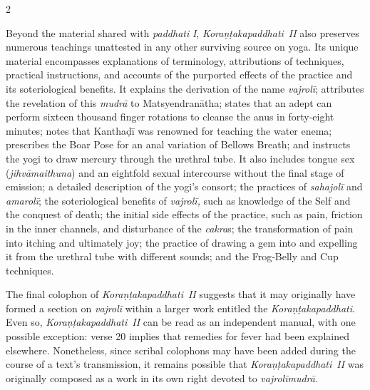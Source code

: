 \begin{nohyp}
\begin{multicols*}{2}
\begin{eng}
Beyond the material shared with \emph{paddhati} \emph{I}, \emph{Koraṇṭakapaddhati}~\emph{II} also preserves numerous teachings unattested in any other surviving source on yoga. Its unique material encompasses explanations of terminology, attributions of techniques, practical instructions, and accounts of the purported effects of the practice and its soteriological benefits. It explains the derivation of the name \emph{vajrolī}; attributes the revelation of this \emph{mudrā} to Matsyendranātha; states that an adept can perform sixteen thousand finger rotations to cleanse the anus in forty-eight minutes; notes that Kanthaḍī was renowned for teaching the water enema; prescribes the Boar Pose for an anal variation of Bellows Breath; and instructs the yogi to draw mercury through the urethral tube. It also includes tongue sex (\emph{jihvāmaithuna}) and an eightfold sexual intercourse without the final stage of emission; a detailed description of the yogi's consort; the practices of \emph{sahajolī} and \emph{amarolī}; the soteriological benefits of \emph{vajrolī,} such as knowledge of the Self and the conquest of death; the initial side effects of the practice, such as pain, friction in the inner channels, and disturbance of the \emph{cakra}s; the transformation of pain into itching and ultimately joy; the practice of drawing a gem into and expelling it from the urethral tube with different sounds; and the Frog-Belly and Cup techniques.

The final colophon of \emph{Koraṇṭakapaddhati}~\emph{II} suggests that it may originally have formed a section on \emph{vajrolī} within a larger work entitled the \emph{Koraṇṭakapaddhati}. Even so, \emph{Koraṇṭakapaddhati}~\emph{II} can be read as an independent manual, with one possible exception: verse 20 implies that remedies for fever had been explained elsewhere. Nonetheless, since scribal colophons may have been added during the course of a text's transmission, it remains possible that \emph{Koraṇṭakapaddhati}~\emph{II} was originally composed as a work in its own right devoted to \emph{vajrolīmudrā.}
\vskip 14pt

\label{koraux1e47ux1e6dakapaddhati-iii}
\vskip 7pt


\end{eng}
\end{multicols*}
\end{nohyp}
